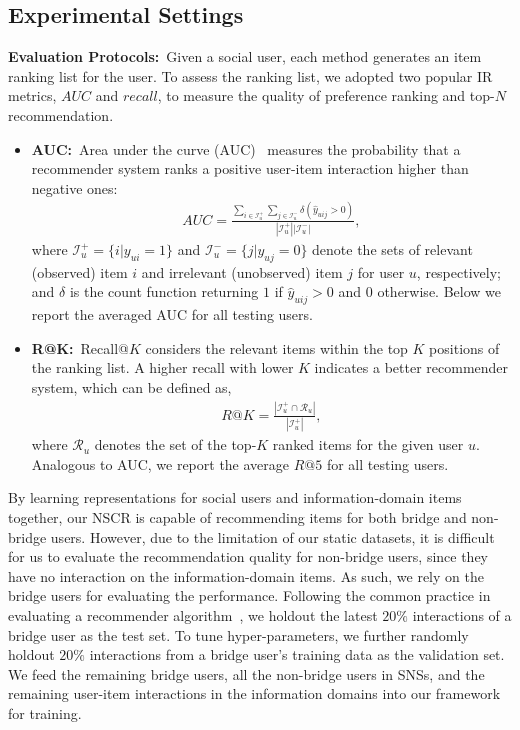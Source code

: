 \documentclass[sigconf]{acmart}
\newcommand{\Mat}[1]{\mathbf{#1}}
\newcommand{\Set}[1]{\mathcal{#1}}
\begin{document}
	\subsection{Experimental Settings}
	\textbf{Evaluation Protocols:}~Given a social user, each method generates an item ranking list for the user.
	To assess the ranking list, we adopted two popular IR metrics, $AUC$ and $recall$, to measure the quality of preference ranking and top-$N$ recommendation.
	\begin{itemize}[leftmargin=*]
\item\textbf{AUC:}~Area under the curve (AUC)~\cite{DBLP:conf/uai/RendleFGS09,DBLP:conf/www/HuCXCGZ13} measures the probability that a recommender system ranks a positive user-item interaction higher than negative ones:
		\begin{gather}
		AUC = \frac{\sum_{i\in\Set{I}_{u}^{+}}\sum_{j\in\Set{I}_{u}^{-}}\delta(\widehat{y}_{uij}>0)}{|\Set{I}_{u}^{+}||\Set{I}_{u}^{-}|},
		\end{gather}
		where $\Set{I}_{u}^{+}=\{i|y_{ui}=1\}$ and $\Set{I}_{u}^{-}=\{j|y_{uj}=0\}$ denote the sets of relevant (observed) item $i$ and irrelevant (unobserved) item $j$ for user $u$, respectively; and $\delta$ is the count function returning $1$ if $\widehat{y}_{uij}>0$ and $0$ otherwise. Below we report the averaged AUC for all testing users.
		\item\textbf{R@$\Mat{K}$:}~Recall@$K$ considers the relevant items within the top $K$ positions of the ranking list. A higher recall with lower $K$ indicates a better recommender system, which can be defined as,
		\begin{gather}
		R@K = \frac{|\Set{I}_{u}^{+}\cap\Set{R}_{u}|}{|\Set{I}_{u}^{+}|},
		\end{gather}
		where $\Set{R}_{u}$ denotes the set of the top-$K$ ranked items for the given user $u$. Analogous to AUC, we report the average $R@5$ for all testing users.
	\end{itemize}
	
	\noindent By learning representations for social users and information-domain items together, our NSCR is capable of recommending items for both bridge and non-bridge users.
	However, due to the limitation of our static datasets, it is difficult for us to evaluate the recommendation quality for non-bridge users, since they have no interaction on the information-domain items.
	As such, we rely on the bridge users for evaluating the performance.
	Following the common practice in evaluating a recommender algorithm~\cite{heneural,DBLP:conf/uai/RendleFGS09},
	we holdout the latest $20\%$ interactions of a bridge user as the test set.
	To tune hyper-parameters, we further randomly holdout $20\%$ interactions from a bridge user's training data as the validation set. We feed the remaining bridge users, all the non-bridge users in SNSs, and the remaining user-item interactions in the information domains into our framework for training.
	
\end{document}
